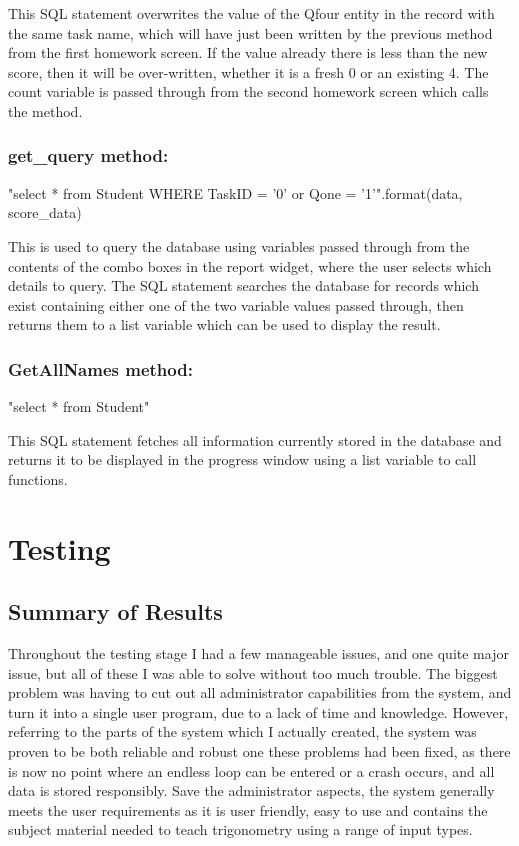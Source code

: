 This SQL statement overwrites the value of the Qfour entity in the record with the same task name, which will have just been written by the previous method from the first homework screen. If the value already there is less than the new score, then it will be over-written, whether it is a fresh 0 or an existing 4. The count variable is passed through from the second homework screen which calls the method.

\subsubsection{get\_query method: }

\begin{python}
"select * from Student WHERE TaskID = '{0}' or Qone = '{1}'".format(data, score_data)
\end{python}

This is used to query the database using variables passed through from the contents of the combo boxes in the report widget, where the user selects which details to query. The SQL statement searches the database for records which exist containing either one of the two variable values passed through, then returns them to a list variable which can be used to display the result.

\subsubsection{GetAllNames method: }

\begin{python}
"select * from Student"
\end{python}

This SQL statement fetches all information currently stored in the database and returns it to be displayed in the progress window using a list variable to call functions.

\section{Testing}

\subsection{Summary of Results}

Throughout the testing stage I had a few manageable issues, and one quite major issue, but all of these I was able to solve without too much trouble. The biggest problem was having to cut out all administrator capabilities from the system, and turn it into a single user program, due to a lack of time and knowledge. However, referring to the parts of the system which I actually created, the system was proven to be both reliable and robust one these problems had been fixed, as there is now no point where an endless loop can be entered or a crash occurs, and all data is stored responsibly. Save the administrator aspects, the system generally meets the user requirements as it is user friendly, easy to use and contains the subject material needed to teach trigonometry using a range of input types.


